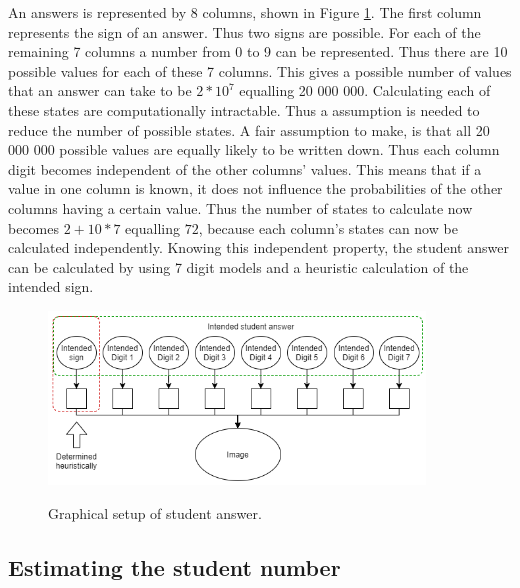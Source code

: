 An answers is represented by 8 columns, shown in Figure \ref{fig:stdAns}. The first column represents the sign of an answer. Thus two signs are possible. For each of the remaining 7 columns a number from 0 to 9 can be represented. Thus there are 10 possible values for each of these 7 columns. This gives a possible number of values that an answer can take to be $2*10^7$ equalling 20 000 000. Calculating each of these states are computationally intractable. Thus a assumption is needed to reduce the number of possible states. A fair assumption to make, is that all 20 000 000 possible values are equally likely to be written down. Thus each column digit becomes independent of the other columns' values. This means that if a value in one column is known, it does not influence the probabilities of the other columns having a certain value. Thus the number of states to calculate now becomes $2+10*7$ equalling $72$, because each column's states can now be calculated independently. Knowing this independent property, the student answer can be calculated by using 7 digit models and a heuristic calculation of the intended sign.

\begin{figure}
  \centering
  \includegraphics[width=10cm]{ans}\\
  \caption{Graphical setup of student answer.}
  \label{fig:stdAns}
\end{figure}



\subsection{Estimating the student number}
\label{sec:studentNumber}

